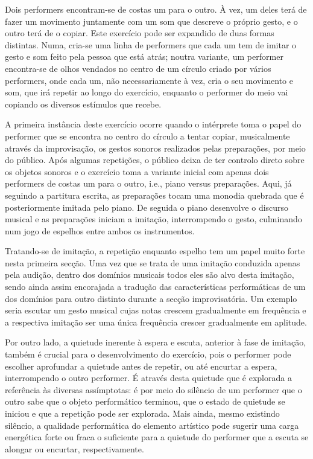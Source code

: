 \documentclass[../main.tex]{subfiles}
\begin{document}
\begin{performex}
    Dois performers encontram-se de costas um para o outro. À vez, um deles terá de fazer um movimento juntamente com um som que descreve o próprio gesto, e o outro terá de o copiar. Este exercício pode ser expandido de duas formas distintas. Numa, cria-se uma linha de performers que cada um tem de imitar o gesto e som feito pela pessoa que está atrás; noutra variante, um performer encontra-se de olhos vendados no centro de um círculo criado por vários performers, onde cada um, não necessariamente à vez, cria o seu movimento e som, que irá repetir ao longo do exercício, enquanto o performer do meio vai copiando os diversos estímulos que recebe.
\end{performex}

A primeira instância deste exercício ocorre quando o intérprete toma o papel do performer que se encontra no centro do círculo a tentar copiar, musicalmente através da improvisação, os gestos sonoros realizados pelas preparações, por meio do público. Após algumas repetições, o público deixa de ter controlo direto sobre os objetos sonoros e o exercício toma a variante inicial com apenas dois performers de costas um para o outro, i.e., piano versus preparações. Aqui, já seguindo a partitura escrita, as preparações tocam uma monodia quebrada que é posteriormente imitada pelo piano. De seguida o piano desenvolve o discurso musical e as preparações iniciam a imitação, interrompendo o gesto, culminando num jogo de espelhos entre ambos os instrumentos.

Tratando-se de imitação, a repetição enquanto espelho tem um papel muito forte nesta primeira secção. Uma vez que se trata de uma imitação conduzida apenas pela audição, dentro dos domínios musicais todos eles são alvo desta imitação, sendo ainda assim encorajada a tradução das características performáticas de um dos domínios para outro distinto durante a secção improvisatória. Um exemplo seria escutar um gesto musical cujas notas crescem gradualmente em frequência e a respectiva imitação ser uma única frequência crescer gradualmente em aplitude.

Por outro lado, a quietude inerente à espera e escuta, anterior à fase de imitação, também é crucial para o desenvolvimento do exercício, pois o performer pode escolher aprofundar a quietude antes de repetir, ou até encurtar a espera, interrompendo o outro performer. É através desta quietude que é explorada a referência às diversas assímptotas: é por meio do silêncio de um performer que o outro sabe que o objeto performático terminou, que o estado de quietude se iniciou e que a repetição pode ser explorada. Mais ainda, mesmo existindo silêncio, a qualidade performática do elemento artístico pode sugerir uma carga energética forte ou fraca o suficiente para a quietude do performer que a escuta se alongar ou encurtar, respectivamente.
\end{document}
